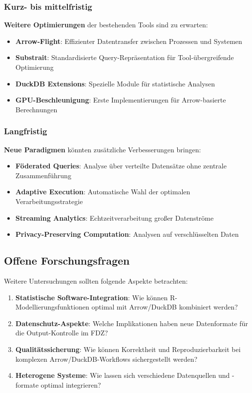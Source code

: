 \documentclass[
  ngerman,
  10pt,
  twocolumn]{article}
\providecommand{\tightlist}{%
  \setlength{\itemsep}{0pt}\setlength{\parskip}{0pt}}
\begin{document}
\subsubsection{Kurz- bis mittelfristig}\label{kurz--bis-mittelfristig}

\textbf{Weitere Optimierungen} der bestehenden Tools sind zu erwarten:

\begin{itemize}
\tightlist
\item
  \textbf{Arrow-Flight}: Effizienter Datentransfer zwischen Prozessen
  und Systemen
\item
  \textbf{Substrait}: Standardisierte Query-Repräsentation für
  Tool-übergreifende Optimierung
\item
  \textbf{DuckDB Extensions}: Spezielle Module für statistische Analysen
\item
  \textbf{GPU-Beschleunigung}: Erste Implementierungen für
  Arrow-basierte Berechnungen
\end{itemize}

\subsubsection{Langfristig}\label{langfristig}

\textbf{Neue Paradigmen} könnten zusätzliche Verbesserungen bringen:

\begin{itemize}
\tightlist
\item
  \textbf{Föderated Queries}: Analyse über verteilte Datensätze ohne
  zentrale Zusammenführung
\item
  \textbf{Adaptive Execution}: Automatische Wahl der optimalen
  Verarbeitungsstrategie
\item
  \textbf{Streaming Analytics}: Echtzeitverarbeitung großer Datenströme
\item
  \textbf{Privacy-Preserving Computation}: Analysen auf verschlüsselten
  Daten
\end{itemize}

\subsection{Offene Forschungsfragen}\label{offene-forschungsfragen}

Weitere Untersuchungen sollten folgende Aspekte betrachten:

\begin{enumerate}
\def\labelenumi{\arabic{enumi}.}
\item
  \textbf{Statistische Software-Integration}: Wie können
  R-Modellierungsfunktionen optimal mit Arrow/DuckDB kombiniert werden?
\item
  \textbf{Datenschutz-Aspekte}: Welche Implikationen haben neue
  Datenformate für die Output-Kontrolle im FDZ?
\item
  \textbf{Qualitätssicherung}: Wie können Korrektheit und
  Reproduzierbarkeit bei komplexen Arrow/DuckDB-Workflows sichergestellt
  werden?
\item
  \textbf{Heterogene Systeme}: Wie lassen sich verschiedene Datenquellen
  und -formate optimal integrieren?
\end{enumerate}
\end{document}
